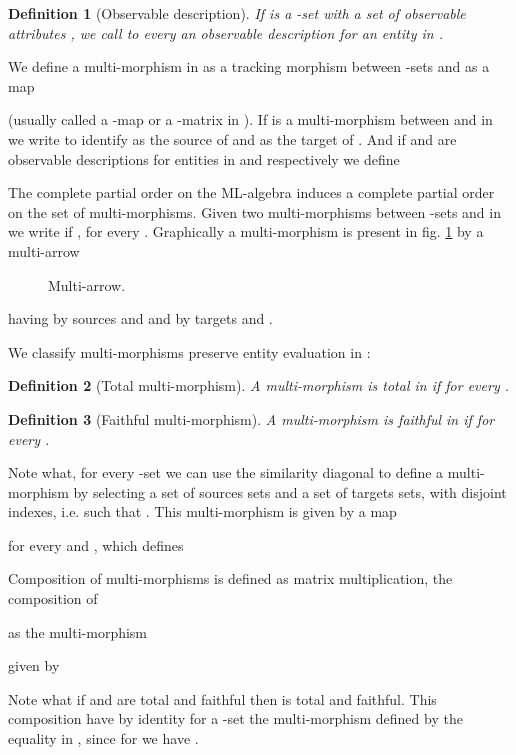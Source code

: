 \documentclass[oribibl]{llncs}
\newtheorem{defn}{Definition}
\begin{document}
\begin{defn}[Observable description]
If  is a -set with a set of observable attributes , we call to every  an \emph{observable description} for an entity in .
\end{defn}


We define a multi-morphism in  as a tracking morphism between -sets  and  as a map

(usually called a -map or a -matrix in \cite{Clementino04}).
 If  is a multi-morphism between  and  in  we write  to identify  as the source of  and  as the target of . And if  and  are observable descriptions for entities in  and  respectively we define
 
 The complete partial order on the ML-algebra  induces a complete partial order on the set of multi-morphisms. Given two multi-morphisms between -sets  and  in   we write  if , for every .
 Graphically a multi-morphism  is present in fig. \ref{multiarrow} by a multi-arrow
\begin{figure}[h]
 
\caption{Multi-arrow.}\label{multiarrow}
\end{figure}
having by sources  and  and by targets  and .

We classify multi-morphisms preserve entity evaluation in :
 \begin{defn}[Total multi-morphism]\label{total}
 A multi-morphism  is \emph{total} in  if 
 for every .
 \end{defn}

 \begin{defn}[Faithful multi-morphism]\label{total}
 A multi-morphism  is \emph{faithful} in  if 
 for every .
 \end{defn}

 Note what, for every -set  we can use the similarity diagonal to define a multi-morphism by selecting a set of sources  sets and a set of targets  sets, with disjoint indexes, i.e. such that . This multi-morphism is given by a map
 
 for every  and , which defines
 

 Composition of multi-morphisms  is defined as matrix multiplication, the composition of

as the multi-morphism

given by

Note what if  and  are total and faithful then  is total and faithful. This composition have by identity for a -set  the multi-morphism  defined by the equality in , since for  we have .
\end{document}
